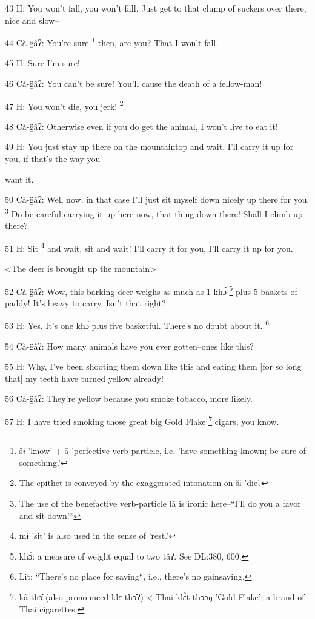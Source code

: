 43 H: You won't fall, you won't fall. Just get to that clump of suckers over there,
nice and slow--

44  Cà-g̈âʔ: You're sure \footnote{š\emph{i} 'know' + ā 'perfective verb-particle, i.e. 'have something known; be sure of something.'} then, are you? That I won't fall.

45 H: Sure I'm sure!

46  Cà-g̈âʔ: You can't be sure! You'll cause the death of a fellow-man!

47 H: You won't die, you jerk! \footnote{The epithet is conveyed by the exaggerated intonation on šɨ 'die'.}

48  Cà-g̈âʔ: Otherwise even if you do get the animal, I won't live to eat it!

49 H: You just stay up there on the mountaintop and wait. I'll carry it up for
you, if that's the way you

want  it.

50  Cà-g̈âʔ: Well now, in that case I'll just sit myself down nicely up there
for you. \footnote{The use of the benefactive verb-particle lâ is ironic here--``I'll do you a favor and sit down!``} Do be careful carrying it up here now, that thing down there! Shall
I climb up there?

51 H: Sit \footnote{mɨ 'sit' is also used in the sense of 'rest.'} and wait, sit and wait! I'll carry it for you, I'll carry it up
for you.

<The deer is brought up the mountain>

52  Cà-g̈âʔ: Wow, this barking  deer weighs as much as 1 khɔ́ \footnote{khɔ́: a measure of weight equal to two tâʔ. See DL:380, 600.} plus 5
baskets of paddy! It's heavy to carry. Isn't that right?

53 H: Yes. It's one khɔ́ plus five basketful.  There's no doubt about it. \footnote{Lit: ``There's no place for saying``, i.e., there's no gainsaying.}

54  Cà-g̈âʔ: How many animals have you ever gotten--ones like this?

55 H: Why, I've been shooting them down like this and eating them [for so long
that] my teeth have turned yellow already!

56  Cà-g̈âʔ: They're yellow because you smoke tobacco, more likely.

57 H: I have tried smoking those great big Gold Flake \footnote{kâ-thɔ̂ (also pronounced klɛ-thɔ̂ʔ) < Thai klɛ̀t thɔɔŋ 'Gold Flake'; a brand of Thai cigarettes.} cigars, you know.

